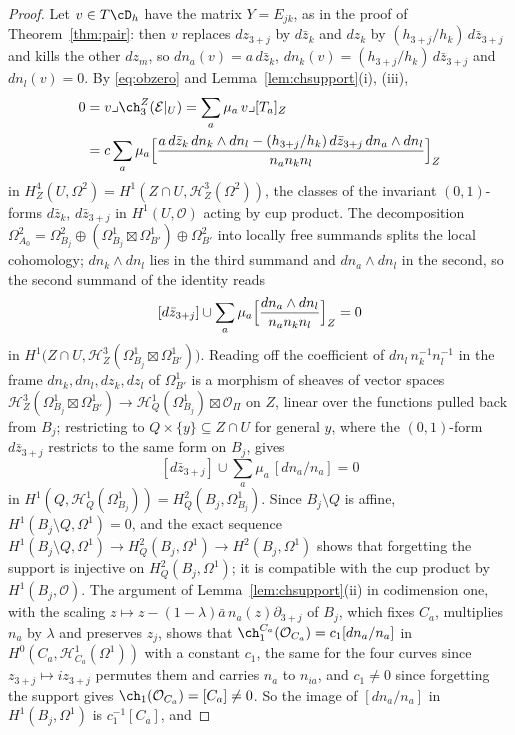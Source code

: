 \begin{proof}
Let $v\in T\cD_{h}$ have the matrix $Y=E_{jk}$, as in the proof of Theorem~\ref{thm:pair}: then $v$ replaces $dz_{3+j}$ by $d\bar z_{k}$ and $dz_{k}$ by $(h_{3+j}/h_{k})\,d\bar z_{3+j}$ and kills the other $dz_{m}$, so $dn_{a}(v)=a\,d\bar z_{k}$, $dn_{k}(v)=(h_{3+j}/h_{k})\,d\bar z_{3+j}$ and $dn_{l}(v)=0$. By \eqref{eq:obzero} and Lemma~\ref{lem:chsupport}(i), (iii),
\begin{align*}
0&=v\lrcorner\ch^{Z}_{3}(\mathcal{E}|_{U})=\sum_{a}\mu_{a}\,v\lrcorner[T_{a}]_{Z}\\
&=c\sum_{a}\mu_{a}\Bigl[\frac{a\,d\bar z_{k}\,dn_{k}\wedge dn_{l}-(h_{3+j}/h_{k})\,d\bar z_{3+j}\,dn_{a}\wedge dn_{l}}{n_{a}n_{k}n_{l}}\Bigr]_{Z}
\end{align*}
in $H^{4}_{Z}(U,\Omega^{2})=H^{1}(Z\cap U,\mathcal{H}^{3}_{Z}(\Omega^{2}))$, the classes of the invariant $(0,1)$-forms $d\bar z_{k}$, $d\bar z_{3+j}$ in $H^{1}(U,\mathcal{O})$ acting by cup product. The decomposition $\Omega^{2}_{A_{0}}=\Omega^{2}_{B_{j}}\oplus(\Omega^{1}_{B_{j}}\boxtimes\Omega^{1}_{B'})\oplus\Omega^{2}_{B'}$ into locally free summands splits the local cohomology; $dn_{k}\wedge dn_{l}$ lies in the third summand and $dn_{a}\wedge dn_{l}$ in the second, so the second summand of the identity reads
\[
[d\bar z_{3+j}]\cup\sum_{a}\mu_{a}\Bigl[\frac{dn_{a}\wedge dn_{l}}{n_{a}n_{k}n_{l}}\Bigr]_{Z}=0
\]
in $H^{1}\bigl(Z\cap U,\mathcal{H}^{3}_{Z}(\Omega^{1}_{B_{j}}\boxtimes\Omega^{1}_{B'})\bigr)$.
Reading off the coefficient of $dn_{l}\,n_{k}^{-1}n_{l}^{-1}$ in the frame $dn_{k},dn_{l},dz_{k},dz_{l}$ of $\Omega^{1}_{B'}$ is a morphism of sheaves of vector spaces $\mathcal{H}^{3}_{Z}(\Omega^{1}_{B_{j}}\boxtimes\Omega^{1}_{B'})\to\mathcal{H}^{1}_{Q}(\Omega^{1}_{B_{j}})\boxtimes\mathcal{O}_{\Pi}$ on $Z$, linear over the functions pulled back from $B_{j}$; restricting to $Q\times\{y\}\subseteq Z\cap U$ for general $y$, where the $(0,1)$-form $d\bar z_{3+j}$ restricts to the same form on $B_{j}$, gives
\[
[d\bar z_{3+j}]\cup\sum_{a}\mu_{a}\,[dn_{a}/n_{a}]=0
\]
in $H^{1}(Q,\mathcal{H}^{1}_{Q}(\Omega^{1}_{B_{j}}))=H^{2}_{Q}(B_{j},\Omega^{1}_{B_{j}})$.
Since $B_{j}\setminus Q$ is affine, $H^{1}(B_{j}\setminus Q,\Omega^{1})=0$, and the exact sequence $H^{1}(B_{j}\setminus Q,\Omega^{1})\to H^{2}_{Q}(B_{j},\Omega^{1})\to H^{2}(B_{j},\Omega^{1})$ shows that forgetting the support is injective on $H^{2}_{Q}(B_{j},\Omega^{1})$; it is compatible with the cup product by $H^{1}(B_{j},\mathcal{O})$. The argument of Lemma~\ref{lem:chsupport}(ii) in codimension one, with the scaling $z\mapsto z-(1-\lambda)\bar a\,n_{a}(z)\partial_{3+j}$ of $B_{j}$, which fixes $C_{a}$, multiplies $n_{a}$ by $\lambda$ and preserves $z_{j}$, shows that $\ch^{C_{a}}_{1}(\mathcal{O}_{C_{a}})=c_{1}[dn_{a}/n_{a}]$ in $H^{0}(C_{a},\mathcal{H}^{1}_{C_{a}}(\Omega^{1}))$ with a constant $c_{1}$, the same for the four curves since $z_{3+j}\mapsto iz_{3+j}$ permutes them and carries $n_{a}$ to $n_{ia}$, and $c_{1}\ne0$ since forgetting the support gives $\ch_{1}(\mathcal{O}_{C_{a}})=[C_{a}]\ne0$. So the image of $[dn_{a}/n_{a}]$ in $H^{1}(B_{j},\Omega^{1})$ is $c_{1}^{-1}[C_{a}]$, and

\end{proof}
